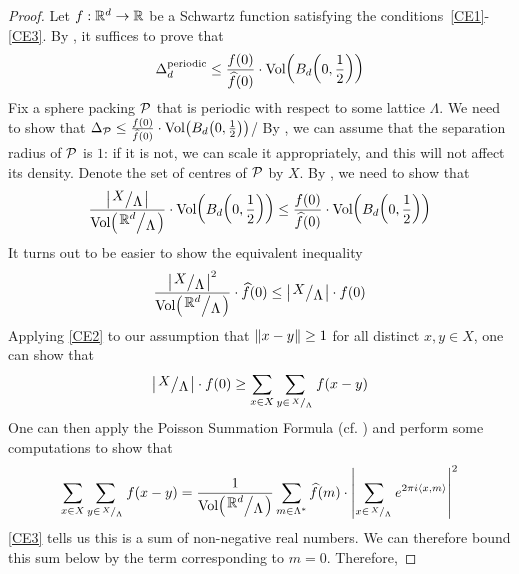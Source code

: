 \begin{proof}
    Let $f : \mathbb{R}^d \to \mathbb{R}$ be a Schwartz function satisfying the conditions~\ref{CE1}-\ref{CE3}. By , it suffices to prove that
    \begin{align*}
        \Delta_d^{\operatorname{periodic}} \leq \frac{f(0)}{\widehat{f}(0)} \cdot \operatorname{Vol}\!\left( B_d\!\left( 0, \frac{1}{2} \right) \right)
    \end{align*}
    Fix a sphere packing $\mathcal{P}$ that is periodic with respect to some lattice $\Lambda$. We need to show that $\Delta_{\mathcal{P}} \leq \frac{f(0)}{\widehat{f}(0)} \cdot \operatorname{Vol}\!\left( B_d\!\left( 0, \frac{1}{2} \right) \right)$/ By , we can assume that the separation radius of $\mathcal{P}$ is $1$: if it is not, we can scale it appropriately, and this will not affect its density. Denote the set of centres of $\mathcal{P}$ by $X$. By , we need to show that
    \begin{align}
        \frac{\abs{\quotient{X}{\Lambda}}}{\Volof{\quotient{\R^d}{\Lambda}}} \cdot \Volof{B_d\of{0, \frac{1}{2}}} \leq \frac{f(0)}{\hat{f}(0)} \cdot \Volof{B_d\of{0, \frac{1}{2}}}
        \label{Ch2:Eq:CohnElkies_Ineq_1}
    \end{align}
    It turns out to be easier to show the equivalent inequality
    \begin{align}
        \frac{\abs{\quotient{X}{\Lambda}}^2}{\Volof{\quotient{\R^d}{\Lambda}}} \cdot \hat{f}(0) \leq \abs{\quotient{X}{\Lambda}} \cdot f(0)
        \label{Ch2:Eq:CohnElkies_Ineq_2}
    \end{align}
    Applying \ref{CE2} to our assumption that $\left\lVert x - y \right\rVert \geq 1$ for all distinct $x, y \in X$, one can show that
    \begin{align}
        \abs{\quotient{X}{\Lambda}} \cdot f(0) \geq \sum_{x \in X} \sum_{y \in {\tiny \quotient{X}{\Lambda}}} \fof{x - y}
        \label{Ch2:Eq:CohnElkies_Ineq_3}
    \end{align}
    One can then apply the Poisson Summation Formula (cf. ) and perform some computations to show that
    \begin{align*}
        \sum_{x \in X} \sum_{y \in {\tiny \quotient{X}{\Lambda}}} \fof{x - y}
        =
        \frac{1}{\Volof{\quotient{\R^d}{\Lambda}}}\sum_{m \in \Lambda^*} \hat{f}(m) \cdot \abs{\sum_{x \in {\tiny \quotient{X}{\Lambda}}} e^{2 \pi i \cycl{x, m}}}^2
    \end{align*}
    \ref{CE3} tells us this is a sum of non-negative real numbers. We can therefore bound this sum below by the term corresponding to $m = 0$. Therefore,

\end{proof}
